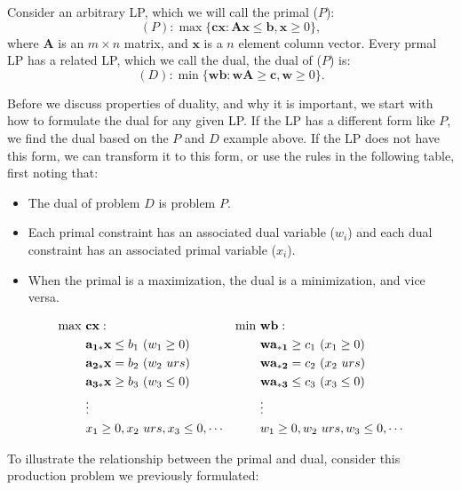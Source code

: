 %


Consider an arbitrary LP, which we will call the primal ($P$): 
$$(P):\max \{\mathbf{cx}: \mathbf{Ax} \le \mathbf{b}, \mathbf{x} \ge 0\},$$ 
where $\mathbf{A}$ is an $m\times n$ matrix, and $\mathbf{x}$ is a $n$ element column vector.  Every prmal LP has a related LP, which we call the dual, the dual of ($P$) is:
$$(D):\min \{\mathbf{wb}: \mathbf{wA} \ge \mathbf{c}, \mathbf{w} \ge 0\}.$$ 

Before we discuss properties of duality, and why it is important, we start with how to formulate the dual for any given LP. If the LP has a different form like $P$, we find the dual based on the $P$ and $D$ example above.  If the LP does not have this form, we can transform it to this form, or use the rules in the following table, first noting that:

\begin{itemize}
\item The dual of problem $D$ is problem $P$.
\item Each primal constraint has an associated dual variable ($w_i$) and each dual constraint has an associated primal variable ($x_i$).
\item When the primal is a maximization, the dual is a minimization, and vice versa.
\end{itemize}

\begin{align*}
\max~& {\bf cx}:~~~~~~~~~~~~			& \min~ & {\bf wb}:  \\
&{\bf a_{1*}x} \le b_1~(w_1 \ge 0)   &     & {\bf wa_{*1}} \ge c_1~(x_1 \ge 0) \\ 
&{\bf a_{2*}x} = b_2~(w_2~urs)       &     & {\bf wa_{*2}} = c_2~(x_2~urs) \\
&{\bf a_{3*}x} \ge b_3~(w_3 \le 0) &        & {\bf wa_{*3}} \le c_3~(x_3 \le 0) \\
&\vdots 							   &      & \vdots \\ 
&x_1 \ge 0, x_2~urs, x_3 \le 0, \cdots &  	 & w_1 \ge 0, w_2~urs, w_3 \le 0,\cdots   
\end{align*}


To illustrate the relationship between the primal and dual, consider this production problem we previously formulated: \\

